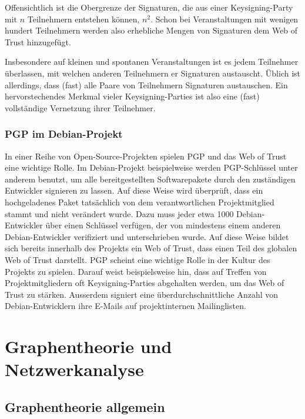 Offensichtlich ist die Obergrenze der Signaturen, die aus einer
Keysigning-Party mit $n$ Teilnehmern entstehen k\"onnen, $n^2$. Schon
bei Veranstaltungen mit wenigen hundert Teilnehmern werden also
erhebliche Mengen von Signaturen dem Web of Trust hinzugef\"ugt.

Insbesondere auf kleinen und spontanen Veranstaltungen ist es jedem
Teilnehmer \"uberlassen, mit welchen anderen Teilnehmern er Signaturen
austauscht. \"Ublich ist allerdings, dass (fast) alle Paare von
Teilnehmern Signaturen austauschen. Ein hervorstechendes Merkmal
vieler Keysigning-Parties ist also eine (fast) vollst\"andige
Vernetzung ihrer Teilnehmer.

\subsubsection{PGP im Debian-Projekt}
\label{sec:foobar-fixme}

In einer Reihe von Open-Source-Projekten spielen PGP und das Web of
Trust eine wichtige Rolle. Im Debian-Projekt beispielweise werden
PGP-Schl\"ussel unter anderem benutzt, um alle bereitgestellten
Softwarepakete durch den zust\"andigen Entwickler signieren zu
lassen. Auf diese Weise wird \"uberpr\"uft, dass ein hochgeladenes
Paket tats\"achlich von dem verantwortlichen Projektmitglied stammt
und nicht ver\"andert wurde. Dazu muss jeder etwa 1000
Debian-Entwickler \"uber einen Schl\"ussel verf\"ugen, der von
mindestens einem anderen Debian-Entwickler verifiziert und
unterschrieben wurde. Auf diese Weise bildet sich bereits innerhalb
des Projekts ein Web of Trust, dass einen Teil des globalen Web of
Trust darstellt. PGP scheint eine wichtige Rolle in der Kultur des
Projekts zu spielen. Darauf weist beispielsweise hin, dass auf Treffen
von Projektmitgliedern oft Keysigning-Parties abgehalten werden, um
das Web of Trust zu st\"arken. Ausserdem signiert eine
\"uberdurchschnittliche Anzahl von Debian-Entwicklern ihre E-Mails auf
projektinternen Mailinglisten.

\section{Graphentheorie und Netzwerkanalyse}
\label{sec:graph-und-netzw}

\subsection{Graphentheorie allgemein}
\label{ch:Grundlagen:sec:Graphentheorie}

